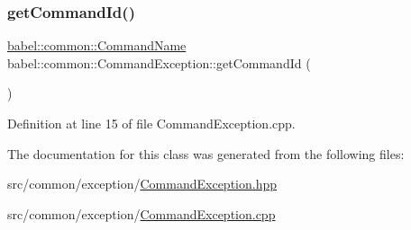 \subsubsection{\texorpdfstring{get\+Command\+Id()}{getCommandId()}}
{\footnotesize\ttfamily \mbox{\hyperlink{namespacebabel_1_1common_a2d31f246c776da6bf656bd71e86cbb2c}{babel\+::common\+::\+Command\+Name}} babel\+::common\+::\+Command\+Exception\+::get\+Command\+Id (\begin{DoxyParamCaption}{ }\end{DoxyParamCaption})}



Definition at line 15 of file Command\+Exception.\+cpp.



The documentation for this class was generated from the following files\+:\begin{DoxyCompactItemize}
\item 
src/common/exception/\mbox{\hyperlink{_command_exception_8hpp}{Command\+Exception.\+hpp}}\item 
src/common/exception/\mbox{\hyperlink{_command_exception_8cpp}{Command\+Exception.\+cpp}}\end{DoxyCompactItemize}
